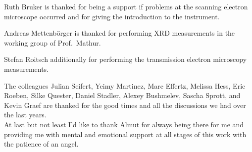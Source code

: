 \documentclass[\main/dresen_thesis.tex]{subfiles}
\begin{document}
	Ruth Bruker is thanked for being a support if problems at the scanning electron microscope occurred and for giving the introduction to the instrument.

	Andreas Mettenb\"orger is thanked for performing XRD measurements in the working group of Prof.\ Mathur.

	Stefan Roitsch additionally for performing the transmission electron microscopy measurements.

	The colleagues Julian Seifert, Yeimy Martinez, Marc Effertz, Melissa Hess, Eric Roeben, Silke Quester, Daniel Stadler, Alexey Bushmelev, Sascha Sprott, and Kevin Graef are thanked for the good times and all the discussions we had over the last years.
	\\

	At last but not least I'd like to thank Almut for always being there for me and providing me with mental and emotional support at all stages of this work with the patience of an angel.
\end{document}
